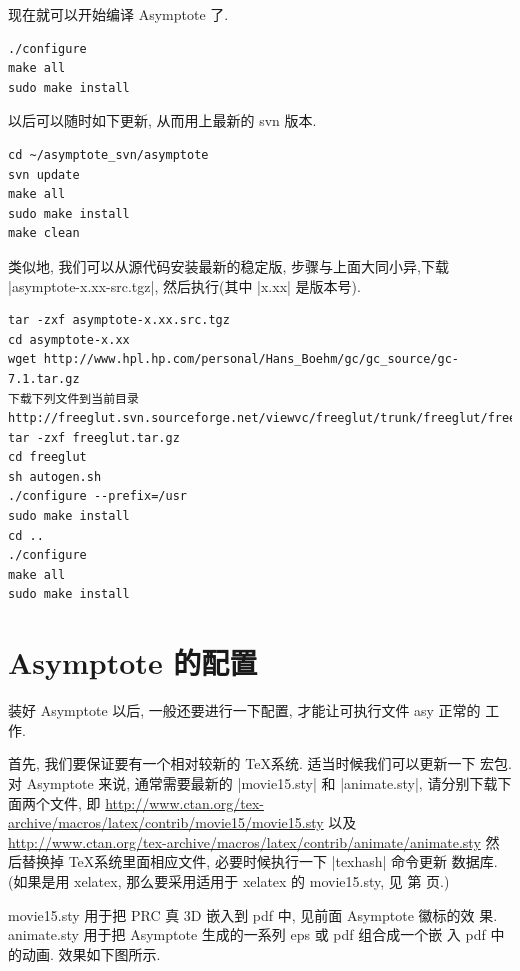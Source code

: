 \documentclass[nofonts,CJKnormalspaces]{ctexbook}
\begin{document}
现在就可以开始编译 Asymptote 了.
\begin{verbatim}
./configure
make all
sudo make install
\end{verbatim}
以后可以随时如下更新, 从而用上最新的 svn 版本.
\begin{verbatim}
cd ~/asymptote_svn/asymptote
svn update
make all
sudo make install
make clean
\end{verbatim}

类似地, 我们可以从源代码安装最新的稳定版, 步骤与上面大同小异,下载
|asymptote-x.xx-src.tgz|, 然后执行(其中 |x.xx| 是版本号).
\begin{verbatim}
tar -zxf asymptote-x.xx.src.tgz
cd asymptote-x.xx
wget http://www.hpl.hp.com/personal/Hans_Boehm/gc/gc_source/gc-7.1.tar.gz
下载下列文件到当前目录
http://freeglut.svn.sourceforge.net/viewvc/freeglut/trunk/freeglut/freeglut.tar.gz
tar -zxf freeglut.tar.gz
cd freeglut
sh autogen.sh
./configure --prefix=/usr
sudo make install
cd ..
./configure
make all
sudo make install
\end{verbatim}

\section{Asymptote 的配置}
装好 Asymptote 以后, 一般还要进行一下配置, 才能让可执行文件 asy 正常的
工作.\label{asy:Settings}

首先, 我们要保证要有一个相对较新的 \TeX 系统. 适当时候我们可以更新一下
宏包. 对 Asymptote 来说, 通常需要最新的 |movie15.sty| 和 |animate.sty|,
请分别下载下面两个文件, 即
\url{http://www.ctan.org/tex-archive/macros/latex/contrib/movie15/movie15.sty}
以及
\url{http://www.ctan.org/tex-archive/macros/latex/contrib/animate/animate.sty}
然后替换掉 \TeX 系统里面相应文件, 必要时候执行一下 |texhash| 命令更新
数据库.(如果是用 xelatex, 那么要采用适用于 xelatex 的 movie15.sty, 见
第 \pageref{movie15:xelatex} 页.)

movie15.sty 用于把 PRC 真 3D 嵌入到 pdf 中, 见前面 Asymptote 徽标的效
果. animate.sty 用于把 Asymptote 生成的一系列 eps 或 pdf 组合成一个嵌
入 pdf 中的动画. 效果如下图所示.
\end{document}
